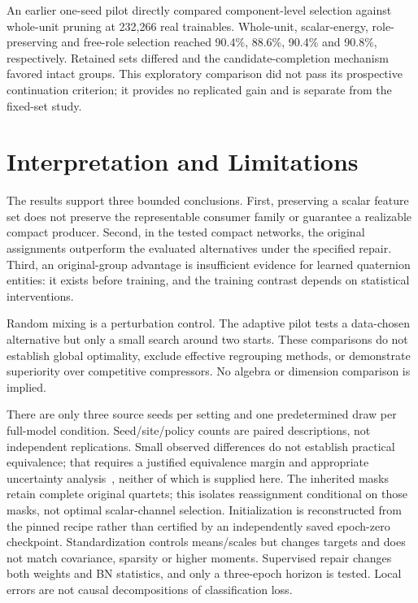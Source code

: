\documentclass[conference,letterpaper,10pt]{IEEEtran}
\newcommand{\aidraft}{\par\noindent{\footnotesize\textit{AI-assisted drafting}~\cite{OpenAI2026Codex}.}\par}
\begin{document}
An earlier one-seed pilot directly compared component-level selection against whole-unit pruning at 232,266 real trainables. Whole-unit, scalar-energy, role-preserving and free-role selection reached 90.4\%, 88.6\%, 90.4\% and 90.8\%, respectively. Retained sets differed and the candidate-completion mechanism favored intact groups. This exploratory comparison did not pass its prospective continuation criterion; it provides no replicated gain and is separate from the fixed-set study.

\section{Interpretation and Limitations}
\aidraft
The results support three bounded conclusions. First, preserving a scalar feature set does not preserve the representable consumer family or guarantee a realizable compact producer. Second, in the tested compact networks, the original assignments outperform the evaluated alternatives under the specified repair. Third, an original-group advantage is insufficient evidence for learned quaternion entities: it exists before training, and the training contrast depends on statistical interventions.

Random mixing is a perturbation control. The adaptive pilot tests a data-chosen alternative but only a small search around two starts. These comparisons do not establish global optimality, exclude effective regrouping methods, or demonstrate superiority over competitive compressors. No algebra or dimension comparison is implied.

There are only three source seeds per setting and one predetermined draw per full-model condition. Seed/site/policy counts are paired descriptions, not independent replications. Small observed differences do not establish practical equivalence; that requires a justified equivalence margin and appropriate uncertainty analysis~\cite{Lakens2017Equivalence}, neither of which is supplied here. The inherited masks retain complete original quartets; this isolates reassignment conditional on those masks, not optimal scalar-channel selection. Initialization is reconstructed from the pinned recipe rather than certified by an independently saved epoch-zero checkpoint. Standardization controls means/scales but changes targets and does not match covariance, sparsity or higher moments. Supervised repair changes both weights and BN statistics, and only a three-epoch horizon is tested. Local errors are not causal decompositions of classification loss.
\end{document}
